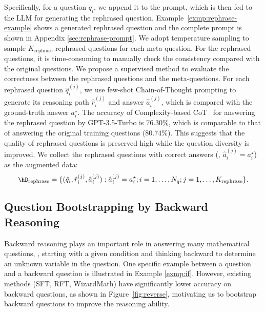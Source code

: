 Specifically, for a question $q_i$, we append it to the prompt, which is then fed to the LLM for generating the rephrased question. Example~\ref{exmp:rephrase-example} shows a generated rephrased question and the complete prompt is shown in Appendix \ref{sec:rephrase-prompt}. We adopt temperature sampling to sample $K_{\text{rephrase}}$ rephrased questions for each meta-question. For the rephrased questions, it is time-consuming to manually check the consistency compared with the original questions. We propose a supervised method to evaluate the correctness between the rephrased questions and the meta-questions. For each rephrased question $\hat{q}_i^{(j)}$, we use few-shot Chain-of-Thought prompting to generate its reasoning path $\hat{r}_i^{(j)}$ and answer $\hat{a}_i^{(j)}$, which is compared with the ground-truth answer $a_i^\star$. The accuracy of Complexity-based CoT~\citep{fu2023complexitybased} for answering the rephrased question by GPT-3.5-Turbo is $76.30\%$, which is comparable to that of answering the original training questions ($80.74\%$). This suggests that the quality of rephrased questions is preserved high while the question diversity is improved. We collect the rephrased questions with correct answers (\ie, $\hat{a}_i^{(j)} = a_i^\star$) as the augmented data:
\begin{equation}
\small
\hD_{\text{rephrase}} = \{(\hat{q}_i, \hat{r}_i^{(j)}, \hat{a}_i^{(j)}): \hat{a}_i^{(j)} = a_i^\star;  i=1,\dots, N_q; j=1,\dots, K_{\text{rephrase}}\}.
\end{equation}

 
	
\subsection{Question Bootstrapping by Backward Reasoning}
\vspace{-1mm}

Backward reasoning plays an important role in answering many mathematical questions, \ie, starting with a given condition and thinking backward to determine an unknown variable in the question. One specific example between a question and a backward question is illustrated in Example \ref{exmp:if}. 
However, existing methods (SFT, RFT, WizardMath) have significantly lower accuracy on backward questions, as shown in Figure~\ref{fig:reverse}, motivating us to bootstrap backward questions to improve the reasoning ability.

\vspace{2mm}


